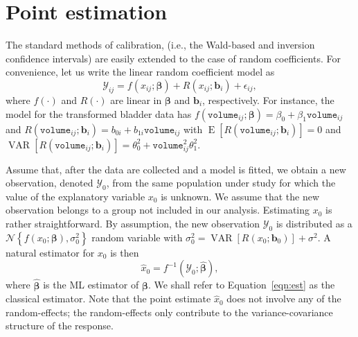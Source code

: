 \documentclass{article}\usepackage[]{graphicx}\usepackage[]{color}
\newcommand{\VAR}{\operatorname{VAR}}
\newcommand{\E}{\operatorname{E}}
\begin{document}

\section{Point estimation}\label{sec:point}

The standard methods of calibration, (i.e., the Wald-based and inversion confidence intervals) are easily extended to the case of random coefficients.  For convenience, let us write the linear random coefficient model as
\begin{equation*}
  \mathcal{Y}_{ij} = f\left(x_{ij}; \bm{\beta}\right) + R\left(x_{ij}; \bm{b}_i\right) + \epsilon_{ij},
\end{equation*}
where $f(\cdot)$ and $R(\cdot)$ are linear in $\bm{\beta}$ and $\bm{b}_i$, respectively.  For instance, the model for the transformed bladder data has $f\left(\texttt{volume}_{ij}; \bm{\beta}\right) = \beta_0 + \beta_1 \texttt{volume}_{ij}$ and $R\left(\texttt{volume}_{ij}; \bm{b}_i\right) = b_{0i} + b_{1i}\texttt{volume}_{ij}$ with $\E\left[R\left(\texttt{volume}_{ij}; \bm{b}_i\right)\right] = 0$ and $\VAR\left[R\left(\texttt{volume}_{ij}; \bm{b}_i\right)\right] = \theta_0^2 + \texttt{volume}_{ij}^2\theta_1^2$.

Assume that, after the data are collected and a model is fitted, we obtain a new observation, denoted $\mathcal{Y}_0$, from the same population under study for which the value of the explanatory variable $x_0$ is unknown.  We assume that the new observation belongs to a group not included in our analysis.  Estimating $x_0$ is rather straightforward.  By assumption, the new observation $\mathcal{Y}_0$ is distributed as a $\mathcal{N}\left\{f\left(x_0; \bm{\beta}\right), \sigma_0^2\right\}$ random variable with $\sigma_0^2 = \VAR\left[ R\left( x_0; \bm{b}_0 \right) \right ] + \sigma^2$.  A natural estimator for $x_0$ is then
\begin{equation}
\label{eqn:est}
  \widehat{x}_0 = f^{-1}\left(\mathcal{Y}_0; \widehat{\bm{\beta}}\right),
\end{equation}
where $\widehat{\bm{\beta}}$ is the ML estimator of $\bm{\beta}$.  We shall refer to Equation~\eqref{eqn:est} as the classical estimator.  Note that the point estimate $\widehat{x}_0$ does not involve any of the random-effects; the random-effects only contribute to the variance-covariance structure of the response.
\end{document}
